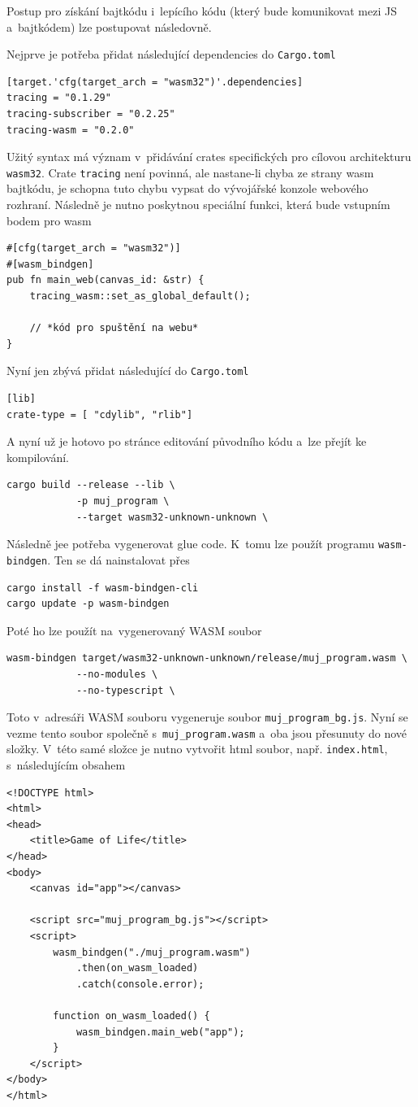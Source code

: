\documentclass[a4paper, 12pt, twoside]{article} %
\begin{document}
		Postup pro získání bajtkódu i~lepícího kódu (který bude komunikovat mezi JS a~bajtkódem) lze postupovat následovně.
		
		Nejprve je potřeba přidat následující dependencies do \texttt{Cargo.toml}
		\begin{verbatim}
[target.'cfg(target_arch = "wasm32")'.dependencies]
tracing = "0.1.29"
tracing-subscriber = "0.2.25"
tracing-wasm = "0.2.0"
		\end{verbatim}
		
		Užitý syntax má význam v~přidávání crates specifických pro cílovou architekturu \texttt{wasm32}. Crate \texttt{tracing} není povinná, ale nastane-li chyba ze strany wasm bajtkódu, je schopna tuto chybu vypsat do vývojářské konzole webového rozhraní. Následně je nutno poskytnou speciální funkci, která bude vstupním bodem pro wasm
		\begin{verbatim}
#[cfg(target_arch = "wasm32")]
#[wasm_bindgen]
pub fn main_web(canvas_id: &str) {
	tracing_wasm::set_as_global_default();

	// *kód pro spuštění na webu*
}
		\end{verbatim}
		
		Nyní jen zbývá přidat následující do \texttt{Cargo.toml}
\begin{verbatim}
[lib]
crate-type = [ "cdylib", "rlib"]
		\end{verbatim}
		
		A nyní už je hotovo po stránce editování původního kódu a~lze přejít ke kompilování.
		\begin{verbatim}
cargo build --release --lib \
			-p muj_program \
			--target wasm32-unknown-unknown \
		\end{verbatim}
		
		Následně jee potřeba vygenerovat glue code. K~tomu lze použít programu \texttt{wasm-bindgen}. Ten se dá nainstalovat přes
		\begin{verbatim}
cargo install -f wasm-bindgen-cli
cargo update -p wasm-bindgen
		\end{verbatim}
		
		Poté ho lze použít na~vygenerovaný WASM soubor
		\begin{verbatim}
wasm-bindgen target/wasm32-unknown-unknown/release/muj_program.wasm \
			--no-modules \
			--no-typescript \
		\end{verbatim}
		
		Toto v~adresáři WASM souboru vygeneruje soubor \texttt{muj\_program\_bg.js}. Nyní se vezme tento soubor společně s~\texttt{muj\_program.wasm} a~oba jsou přesunuty do nové složky. V~této samé složce je nutno vytvořit html soubor, např. \texttt{index.html}, s~následujícím obsahem
		\begin{verbatim}
<!DOCTYPE html>
<html>
<head>
	<title>Game of Life</title>
</head>
<body>
	<canvas id="app"></canvas>

	<script src="muj_program_bg.js"></script>
	<script>
		wasm_bindgen("./muj_program.wasm")
			.then(on_wasm_loaded)
			.catch(console.error);

		function on_wasm_loaded() {
			wasm_bindgen.main_web("app");
		}
	</script>
</body>
</html>
		\end{verbatim}
		
\end{document}
